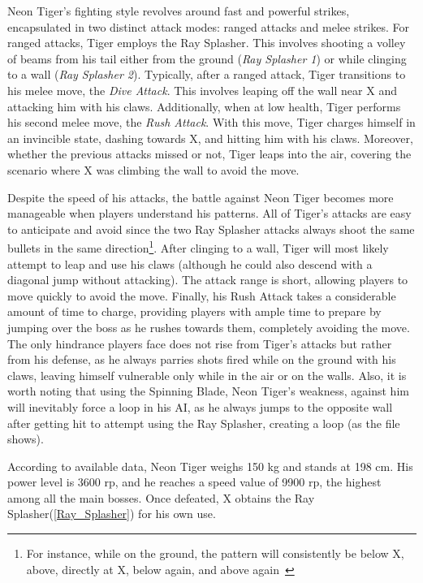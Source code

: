 Neon Tiger's fighting style revolves around fast and powerful strikes, encapsulated in two distinct attack modes: ranged attacks and melee strikes. For ranged attacks, Tiger employs the Ray Splasher. This involves shooting a volley of beams from his tail either from the ground (\emph{Ray Splasher 1}) or while clinging to a wall (\emph{Ray Splasher 2}). Typically, after a ranged attack, Tiger transitions to his melee move, the \emph{Dive Attack}. This involves leaping off the wall near X and attacking him with his claws. Additionally, when at low health, Tiger performs his second melee move, the \emph{Rush Attack}. With this move, Tiger charges himself in an invincible state, dashing towards X, and hitting him with his claws. Moreover, whether the previous attacks missed or not, Tiger leaps into the air, covering the scenario where X was climbing the wall to avoid the move.


Despite the speed of his attacks, the battle against Neon Tiger becomes more manageable when players understand his patterns. All of Tiger's attacks are easy to anticipate and avoid since the two Ray Splasher attacks always shoot the same bullets in the same direction\footnote{For instance, while on the ground, the pattern will consistently be below X, above, directly at X, below again, and above again~\cite{stratwiki:Safari}}. After clinging to a wall, Tiger will most likely attempt to leap and use his claws (although he could also descend with a diagonal jump without attacking). The attack range is short, allowing players to move quickly to avoid the move. Finally, his Rush Attack takes a considerable amount of time to charge, providing players with ample time to prepare by jumping over the boss as he rushes towards them, completely avoiding the move. The only hindrance players face does not rise from Tiger's attacks but rather from his defense, as he always parries shots fired while on the ground with his claws, leaving himself vulnerable only while in the air or on the walls. Also, it is worth noting that using the Spinning Blade, Neon Tiger's weakness, against him will inevitably force a loop in his AI, as he always jumps to the opposite wall after getting hit to attempt using the Ray Splasher, creating a loop (as the file  shows).

According to available data, Neon Tiger weighs 150 kg and stands at 198 cm. His power level is 3600 rp, and he reaches a speed value of 9900 rp, the highest among all the main bosses. Once defeated, X obtains the Ray Splasher(\ref{Ray_Splasher}) for his own use.

